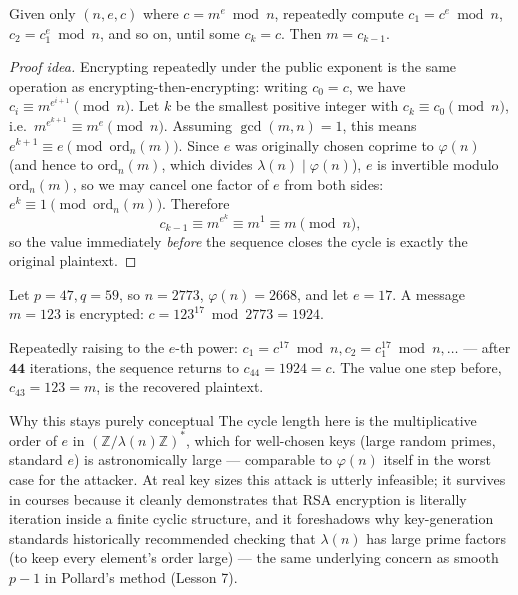 \begin{theorem}
Given only $(n,e,c)$ where $c = m^e \bmod n$, repeatedly compute $c_1 = c^e \bmod n$, $c_2 = c_1^{e} \bmod n$, and so on, until some $c_k = c$. Then $m = c_{k-1}$.
\end{theorem}

\begin{proof}[Proof idea]
Encrypting repeatedly under the public exponent is the same operation as encrypting-then-encrypting: writing $c_0 = c$, we have $c_i \equiv m^{e^{i+1}} \pmod n$. Let $k$ be the smallest positive integer with $c_k \equiv c_0 \pmod n$, i.e.\ $m^{e^{k+1}} \equiv m^{e} \pmod n$. Assuming $\gcd(m,n)=1$, this means $e^{k+1} \equiv e \pmod{\mathrm{ord}_n(m)}$. Since $e$ was originally chosen coprime to $\varphi(n)$ (and hence to $\mathrm{ord}_n(m)$, which divides $\lambda(n) \mid \varphi(n)$), $e$ is invertible modulo $\mathrm{ord}_n(m)$, so we may cancel one factor of $e$ from both sides: $e^{k} \equiv 1 \pmod{\mathrm{ord}_n(m)}$. Therefore
\[
c_{k-1} \equiv m^{e^{k}} \equiv m^{1} \equiv m \pmod n,
\]
so the value immediately \emph{before} the sequence closes the cycle is exactly the original plaintext.
\end{proof}

\begin{example}
Let $p=47, q=59$, so $n=2773$, $\varphi(n)=2668$, and let $e=17$. A message $m=123$ is encrypted: $c = 123^{17} \bmod 2773 = 1924$.

Repeatedly raising to the $e$-th power: $c_1 = c^{17} \bmod n, c_2 = c_1^{17} \bmod n, \dots$ — after $\mathbf{44}$ iterations, the sequence returns to $c_{44} = 1924 = c$. The value one step before, $c_{43} = 123 = m$, is the recovered plaintext.
\end{example}

\begin{warnbox}{Why this stays purely conceptual}
The cycle length here is the multiplicative order of $e$ in $(\mathbb{Z}/\lambda(n)\mathbb{Z})^{*}$, which for well-chosen keys (large random primes, standard $e$) is astronomically large — comparable to $\varphi(n)$ itself in the worst case for the attacker. At real key sizes this attack is utterly infeasible; it survives in courses because it cleanly demonstrates that RSA encryption is literally iteration inside a finite cyclic structure, and it foreshadows why key-generation standards historically recommended checking that $\lambda(n)$ has large prime factors (to keep every element's order large) — the same underlying concern as smooth $p-1$ in Pollard's method (Lesson 7).
\end{warnbox}

